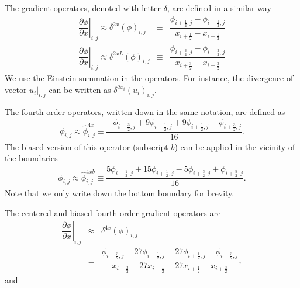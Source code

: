 \documentclass[gmd]{copernicus}
\begin{document}
The gradient operators, denoted with letter $\delta$, are defined in a similar way
\begin{eqnarray}
\left. \dfrac{\partial \phi}{\partial x}\right|_{i,j} \approx \delta^{2x} \left( \phi \right)_{i,j} & \equiv & \dfrac{\phi_{i+\frac{1}{2},j} - \phi_{i-\frac{1}{2},j}}
                                                                                                                 {   x_{i+\frac{1}{2}}   -    x_{i-\frac{1}{2}  }} \\
\left. \dfrac{\partial \phi}{\partial x}\right|_{i,j} \approx \delta^{2xL} \left( \phi \right)_{i,j}& \equiv & \dfrac{\phi_{i+\frac{3}{2},j} - \phi_{i-\frac{3}{2},j}}
                                                                                                                  {   x_{i+\frac{3}{2}}   -    x_{i-\frac{3}{2}  }}
\end{eqnarray}
We use the Einstein summation in the operators. For instance, the divergence of vector $\left.u_i\right|_{i,j}$ can be written as $\delta^{2x_i}\left( u_i \right)_{i,j}$.
% 

The fourth-order operators, written down in the same notation, are defined as
\begin{eqnarray}
\phi_{i,j} \approx \widehat{\phi}^{4x}_{i,j} \equiv \dfrac{- \phi_{i-\frac{3}{2},j} + 9 \phi_{i-\frac{1}{2},j} + 9 \phi_{i+\frac{1}{2},j} - \phi_{i+\frac{3}{2},j}}{16}.\label{eq:interp4}
\end{eqnarray}
The biased version of this operator (subscript $b$) can be applied in the vicinity of the boundaries 
\begin{eqnarray}
\phi_{i,j} \approx \widehat{\phi}^{4xb}_{i,j} \equiv \dfrac{ 5 \phi_{i-\frac{1}{2},j} + 15 \phi_{i+\frac{1}{2},j} - 5 \phi_{i+\frac{3}{2},j} + \phi_{i+\frac{5}{2},j}}{16}.
\end{eqnarray}
Note that we only write down the bottom boundary for brevity.

The centered and biased fourth-order gradient operators are
\begin{eqnarray}
\nonumber
\left. \dfrac{\partial \phi}{\partial x}\right|_{i,j} & \approx & \delta^{4x} \left( \phi \right)_{i,j}\\
& \equiv & \dfrac{\phi_{i-\frac{3}{2},j} - 27 \phi_{i-\frac{1}{2},j} + 27 \phi_{i+\frac{1}{2},j} - \phi_{i+\frac{3}{2},j}}
             {       x_{i-\frac{3}{2}}   - 27    x_{i-\frac{1}{2}}   + 27    x_{i+\frac{1}{2}}   -    x_{i+\frac{3}{2}}},
\end{eqnarray}
and
\end{document}
